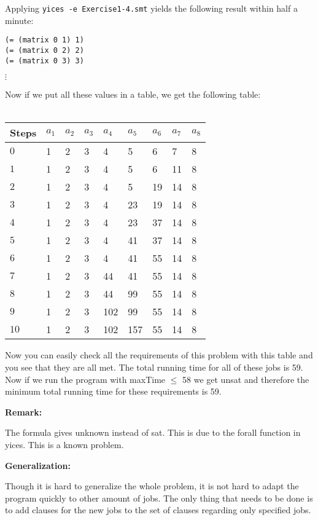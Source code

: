 \documentclass[12pt]{article}
\begin{document}
\noindent Applying {\tt yices -e Exercise1-4.smt} yields the following result
within half a minute:

{\footnotesize
\begin{verbatim}
(= (matrix 0 1) 1)
(= (matrix 0 2) 2)
(= (matrix 0 3) 3)
\end{verbatim} 
$\vdots$
}

\noindent Now if we put all these values in a table, we get the following table:\\
\\
\begin{tabular}{| l | l | l | l | l | l | l | l | l |}
\hline
Steps	& $a_1$	& $a_2$	& $a_3$ & $a_4$ & $a_5$	& $a_6$	& $a_7$ & $a_8$\\
\hline
$0$	& 1	&	2	&	3 & 4	&	5	&	6 & 7 & 8\\
$1$	& 1	&	2	&	3 & 4	&	5	&	6 & 11 & 8\\
$2$	& 1	&	2	&	3 & 4	&	5	&	19 & 14 & 8\\
$3$	& 1	&	2	&	3 & 4	&	23	&	19& 14 & 8\\
$4$	& 1	&	2	&	3 & 4	&	23	&	37 & 14 & 8\\
$5$	& 1	&	2	&	3 & 4	&	41	&	37 & 14 & 8\\
$6$	& 1	&	2	&	3 & 4	&	41	&	55 & 14 & 8\\
$7$	& 1	&	2	&	3 & 44	&	41	&	55 & 14 & 8\\
$8$	& 1	&	2	&	3 & 44	&	99	&	55 & 14 & 8\\
$9$	& 1	&	2	&	3 & 102	&	99	&	55 & 14 & 8\\
$10$	& 1	&	2	&	3 & 102	&	157	&	55 & 14 & 8\\
\hline
\end{tabular}

\vspace{3mm}

Now you can easily check all the requirements of this problem with this table and you see that they are all met. The total running time for all of these jobs is 59. Now if we run the program with maxTime $\leq$ 58 we get unsat and therefore the minimum total running time for these requirements is 59.

\vspace{3mm}

{\bf Remark:} 

The formula gives unknown instead of sat. This is due to the forall function in yices. This is a known problem.\\

\vspace{3mm}

{\bf Generalization:} 

Though it is hard to generalize the whole problem, it is not hard to adapt the program quickly to other amount of jobs. The only thing that needs to be done is to add clauses for the new jobs to the set of clauses regarding only specified jobs.\\

\vspace{3mm}
\end{document}
